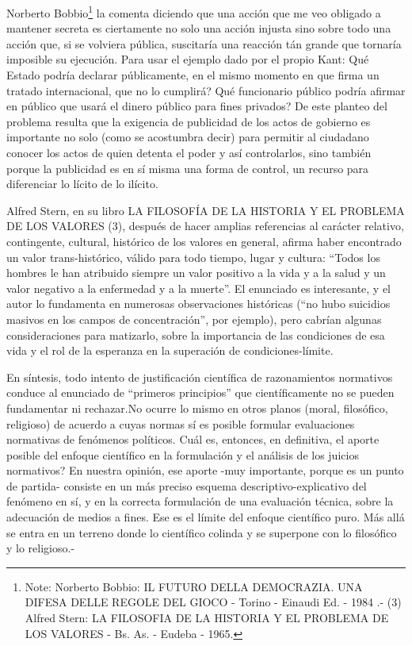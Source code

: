\documentclass[
]{book}
\begin{document}
Norberto Bobbio\footnote{Note: Norberto Bobbio: IL FUTURO DELLA DEMOCRAZIA. UNA DIFESA DELLE REGOLE DEL GIOCO - Torino - Einaudi Ed. - 1984 .- (3) Alfred Stern: LA FILOSOFIA DE LA HISTORIA Y EL PROBLEMA DE LOS VALORES - Bs. As. - Eudeba - 1965.} la comenta diciendo que una acción que me veo obligado a mantener secreta es ciertamente no solo una acción injusta sino sobre todo una acción que, si se volviera pública, suscitaría una reacción tán grande que tornaría imposible su ejecución. Para usar el ejemplo dado por el propio Kant: Qué Estado podría declarar públicamente, en el mismo momento en que firma un tratado internacional, que no lo cumplirá? Qué funcionario público podría afirmar en público que usará el dinero público para fines privados? De este planteo del problema resulta que la exigencia de publicidad de los actos de gobierno es importante no solo (como se acostumbra decir) para permitir al ciudadano conocer los actos de quien detenta el poder y así controlarlos, sino también porque la publicidad es en sí misma una forma de control, un recurso para diferenciar lo lícito de lo ilícito.

Alfred Stern, en su libro LA FILOSOFÍA DE LA HISTORIA Y EL PROBLEMA DE LOS VALORES (3), después de hacer amplias referencias al carácter relativo, contingente, cultural, histórico de los valores en general, afirma haber encontrado un valor trans-histórico, válido para todo tiempo, lugar y cultura: ``Todos los hombres le han atribuido siempre un valor positivo a la vida y a la salud y un valor negativo a la enfermedad y a la muerte''. El enunciado es interesante, y el autor lo fundamenta en numerosas observaciones históricas (``no hubo suicidios masivos en los campos de concentración'', por ejemplo), pero cabrían algunas consideraciones para matizarlo, sobre la importancia de las condiciones de esa vida y el rol de la esperanza en la superación de condiciones-límite.

En síntesis, todo intento de justificación científica de razonamientos normativos conduce al enunciado de ``primeros principios'' que científicamente no se pueden fundamentar ni rechazar.No ocurre lo mismo en otros planos (moral, filosófico, religioso) de acuerdo a cuyas normas sí es posible formular evaluaciones normativas de fenómenos políticos. Cuál es, entonces, en definitiva, el aporte posible del enfoque científico en la formulación y el análisis de los juicios normativos? En nuestra opinión, ese aporte -muy importante, porque es un punto de partida- consiste en un más preciso esquema descriptivo-explicativo del fenómeno en sí, y en la correcta formulación de una evaluación técnica, sobre la adecuación de medios a fines. Ese es el límite del enfoque científico puro. Más allá se entra en un terreno donde lo científico colinda y se superpone con lo filosófico y lo religioso.-
\end{document}
